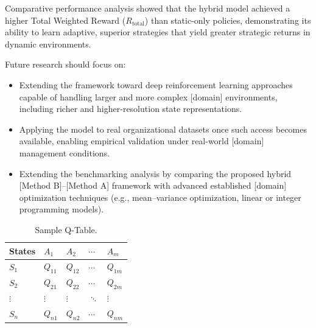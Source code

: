 \documentclass[10pt,twocolumn]{article}
\newcommand{\tabfont}{\fontsize{8.5}{10.5}\selectfont}
\begin{document}
Comparative performance analysis showed that the hybrid model
achieved a higher Total Weighted Reward ($R_{\mathrm{total}}$) than
static-only policies, demonstrating its ability to learn adaptive,
superior strategies that yield greater strategic returns in dynamic
environments.

Future research should focus on:
\begin{itemize}
  \item Extending the framework toward deep reinforcement learning
        approaches capable of handling larger and more complex
        [domain] environments, including richer and
        higher-resolution state representations.
  \item Applying the model to real organizational datasets once
        such access becomes available, enabling empirical validation
        under real-world [domain] management conditions.
  \item Extending the benchmarking analysis by comparing the
        proposed hybrid [Method B]--[Method A] framework with
        advanced established [domain] optimization techniques (e.g.,
        mean--variance optimization, linear or integer programming
        models).
\end{itemize}


\begin{table}[H]
\caption{Sample Q-Table.}
\label{tab:qtable}
\tabfont
\setlength{\tabcolsep}{4pt}
\begin{tabularx}{\columnwidth}{lXXXX}
\toprule
\textbf{States} & $A_1$ & $A_2$ & $\cdots$ & $A_m$ \\
\midrule
$S_1$ & $Q_{11}$ & $Q_{12}$ & $\cdots$ & $Q_{1m}$ \\
$S_2$ & $Q_{21}$ & $Q_{22}$ & $\cdots$ & $Q_{2m}$ \\
$\vdots$ & $\vdots$ & $\vdots$ & $\ddots$ & $\vdots$ \\
$S_n$ & $Q_{n1}$ & $Q_{n2}$ & $\cdots$ & $Q_{nm}$ \\
\bottomrule
\end{tabularx}
\end{table}
\end{document}
